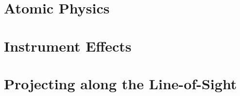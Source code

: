 
\section{Atomic Physics}


\section{Instrument Effects}

\section{Projecting along the Line-of-Sight}
